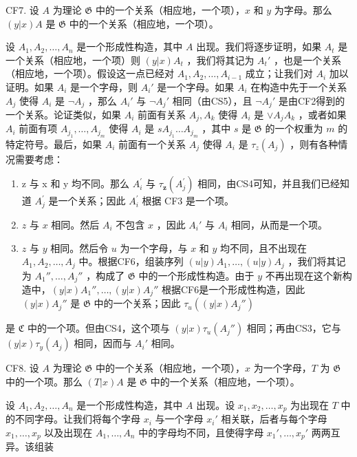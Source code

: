 CF7. 设 \(A\) 为理论 \(\mathfrak{G}\) 中的一个关系（相应地，一个项），\(x\) 和 \(y\) 为字母。那么 \((y|x)A\) 是 \(\mathfrak{G}\) 中的一个关系（相应地，一个项）。

设 \(A_1, A_2, \ldots, A_n\) 是一个形成性构造，其中 \(A\) 出现。我们将逐步证明，如果 \(A_t\) 是一个关系（相应地，一个项）则 \((y|x)A_t\) ，我们将其记为 \(A_t'\) ，也是一个关系（相应地，一个项）。假设这一点已经对 \(A_1, A_2, \ldots, A_{i-1}\) 成立；让我们对 \(A_i\) 加以证明。如果 \(A_i\) 是一个字母，则 \(A_i'\) 是一个字母。如果 \(A_i\) 在构造中先于一个关系 \(A_j\) 使得 \(A_i\) 是 \(\neg A_j\) ，那么 \(A_i'\) 与 \(\neg A_j'\) 相同（由CS5），且 \(\neg A_j'\) 是由CF2得到的一个关系。论证类似，如果 \(A_i\) 前面有关系 \(A_j, A_k\) 使得 \(A_i\) 是 \(\vee A_jA_k\) ，或者如果 \(A_i\) 前面有项 \(A_{j_1}, \ldots, A_{j_m}\) 使得 \(A_i\) 是 \(sA_{j_1}\ldots A_{j_m}\) ，其中 \(s\) 是 \(\mathfrak{G}\) 的一个权重为 \(m\) 的特定符号。最后，如果 \(A_i\) 前面有一个关系 \(A_j\) 使得 \(A_i\) 是 \(\tau_z(A_j)\) ，则有各种情况需要考虑：

\begin{enumerate}
\def\labelenumi{(\alph{enumi})}
\item
  z 与 x 和 y 均不同。那么 \(A_{i}^{\prime}\) 与 \(\tau_{\mathbf{z}}(A_{j}^{\prime})\) 相同，由CS4可知，并且我们已经知道 \(A_{j}^{\prime}\) 是一个关系；因此 \(A_{i}^{\prime}\) 根据 CF3 是一个项。
\item
  \(z\) 与 \(x\) 相同。然后 \(A_i\) 不包含 \(x\) ，因此 \(A_i'\) 与 \(A_i\) 相同，从而是一个项。
\item
  \(z\) 与 \(y\) 相同。然后令 \(u\) 为一个字母，与 \(x\) 和 \(y\) 均不同，且不出现在 \(A_1, A_2, \ldots, A_j\) 中。根据CF6，组装序列 \((u|y) A_1, \ldots, (u|y) A_j\) ，我们将其记为 \(A_1'', \ldots, A_j''\) ，构成了 \(\mathfrak{G}\) 中的一个形成性构造。由于 \(y\) 不再出现在这个新构造中，\((y|x) A_1'', \ldots, (y|x) A_j''\) 根据CF6是一个形成性构造，因此 \((y|x) A_j''\) 是 \(\mathfrak{G}\) 中的一个关系；因此 \(\tau_u((y|x)A_j'')\)
\end{enumerate}

是 \(\mathfrak{C}\) 中的一个项。但由CS4，这个项与 \((y|x)\tau_u(A_j'')\) 相同；再由CS3，它与 \((y|x)\tau_y(A_j)\) 相同，因而与 \(A_i'\) 相同。

CF8. 设 \(A\) 为理论 \(\mathfrak{G}\) 中的一个关系（相应地，一个项），\(x\) 为一个字母，\(T\) 为 \(\mathfrak{G}\) 中的一个项。那么 \((T|x)A\) 是 \(\mathfrak{G}\) 中的一个关系（相应地，一个项）。

设 \(A_1, A_2, \ldots, A_n\) 是一个形成性构造，其中 \(A\) 出现。设 \(x_1, x_2, \ldots, x_p\) 为出现在 \(T\) 中的不同字母。让我们将每个字母 \(x_i\) 与一个字母 \(x_i'\) 相关联，后者与每个字母 \(x_1, \ldots, x_p\) 以及出现在 \(A_1, \ldots, A_n\) 中的字母均不同，且使得字母 \(x_1', \ldots, x_p'\) 两两互异。该组装

